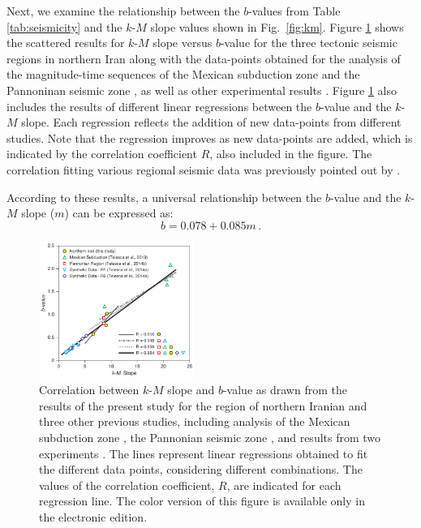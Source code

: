 Next, we examine the relationship between the $b$-values from Table \ref{tab:seismicity} and the $k$-$M$ slope values shown in Fig.~\ref{fig:km}. Figure \ref{fig:regression} shows the scattered results for $k$-$M$ slope versus $b$-value for the three tectonic seismic regions in northern Iran along with the data-points obtained for the analysis of the magnitude-time sequences of the Mexican subduction zone \citep{Telesca2013} and the Pannoninan seismic zone \citep{Telesca2014}, as well as other experimental results \citep{Telesca2014-pone}. Figure \ref{fig:regression} also includes the results of different linear regressions between the $b$-value and the $k$-$M$ slope. Each regression reflects the addition of new data-points from different studies. Note that the regression improves as new data-points are added, which is indicated by the correlation coefficient $R$, also included in the figure. The correlation fitting various regional seismic data was previously pointed out by \citet{Telesca2014}.

According to these results, a universal relationship between the $b$-value and the $k$-$M$ slope ($m$) can be expressed as:
% 
\begin{equation}
	b = 0.078 + 0.085 m \, .
	\label{eq:universal.bm}
\end{equation}

\begin{figure}[h]%
	\centering
	\includegraphics[width=0.45\textwidth]{figures/pdf/figure-07} 
	\caption{Correlation between $k$-$M$ slope and $b$-value as drawn from the results of the present study for the region of northern Iranian and three other previous studies, including analysis of the Mexican subduction zone \citep{Telesca2013}, the Pannonian seismic zone \citep{Telesca2014}, and results from two experiments \citep{Telesca2014-pone}. The lines represent linear regressions obtained to fit the different data points, considering different combinations. The values of the correlation coefficient, $R$, are indicated for each regression line. The color version of this figure is available only in the electronic edition.}
	\label{fig:regression}
\end{figure}

